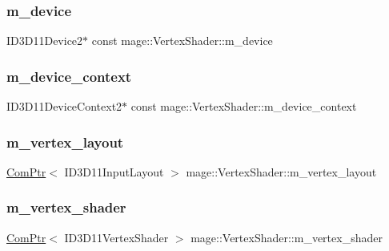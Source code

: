 \subsubsection{\texorpdfstring{m\+\_\+device}{m\_device}}
{\footnotesize\ttfamily I\+D3\+D11\+Device2$\ast$ const mage\+::\+Vertex\+Shader\+::m\+\_\+device\hspace{0.3cm}{\ttfamily [protected]}}

\hypertarget{classmage_1_1_vertex_shader_a1c286b3eafd0a0b45beb2b17065f0f0e}{}\label{classmage_1_1_vertex_shader_a1c286b3eafd0a0b45beb2b17065f0f0e} 
\subsubsection{\texorpdfstring{m\+\_\+device\+\_\+context}{m\_device\_context}}
{\footnotesize\ttfamily I\+D3\+D11\+Device\+Context2$\ast$ const mage\+::\+Vertex\+Shader\+::m\+\_\+device\+\_\+context\hspace{0.3cm}{\ttfamily [protected]}}

\hypertarget{classmage_1_1_vertex_shader_a9b9895650b8c7f80af846d75f7d9ddda}{}\label{classmage_1_1_vertex_shader_a9b9895650b8c7f80af846d75f7d9ddda} 
\subsubsection{\texorpdfstring{m\+\_\+vertex\+\_\+layout}{m\_vertex\_layout}}
{\footnotesize\ttfamily \hyperlink{namespacemage_ae74f374780900893caa5555d1031fd79}{Com\+Ptr}$<$ I\+D3\+D11\+Input\+Layout $>$ mage\+::\+Vertex\+Shader\+::m\+\_\+vertex\+\_\+layout\hspace{0.3cm}{\ttfamily [protected]}}

\hypertarget{classmage_1_1_vertex_shader_a0b2b02abae4cb226c115d7f1c5464a54}{}\label{classmage_1_1_vertex_shader_a0b2b02abae4cb226c115d7f1c5464a54} 
\subsubsection{\texorpdfstring{m\+\_\+vertex\+\_\+shader}{m\_vertex\_shader}}
{\footnotesize\ttfamily \hyperlink{namespacemage_ae74f374780900893caa5555d1031fd79}{Com\+Ptr}$<$ I\+D3\+D11\+Vertex\+Shader $>$ mage\+::\+Vertex\+Shader\+::m\+\_\+vertex\+\_\+shader\hspace{0.3cm}{\ttfamily [protected]}}

